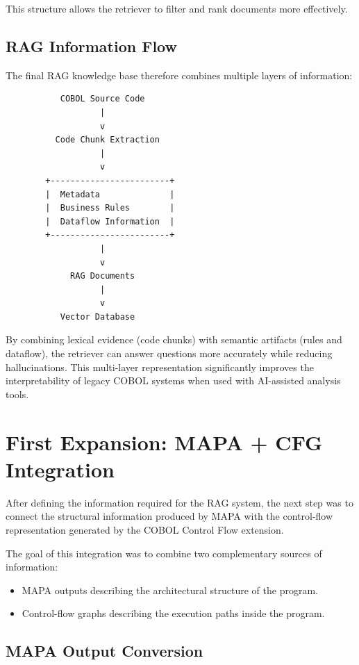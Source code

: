 \documentclass[11pt]{article}
\begin{document}
This structure allows the retriever to filter and rank documents more effectively.

\subsection*{RAG Information Flow}

The final RAG knowledge base therefore combines multiple layers of information:

\begin{center}
\begin{verbatim}
           COBOL Source Code
                   |
                   v
          Code Chunk Extraction
                   |
                   v
        +------------------------+
        |  Metadata              |
        |  Business Rules        |
        |  Dataflow Information  |
        +------------------------+
                   |
                   v
             RAG Documents
                   |
                   v
           Vector Database
\end{verbatim}
\end{center}

By combining lexical evidence (code chunks) with semantic artifacts (rules and dataflow), the retriever can answer questions more accurately while reducing hallucinations. This multi-layer representation significantly improves the interpretability of legacy COBOL systems when used with AI-assisted analysis tools.


\section{First Expansion: MAPA + CFG Integration}
\label{sec:integration}

After defining the information required for the RAG system, the next step was to connect the structural information produced by MAPA with the control-flow representation generated by the COBOL Control Flow extension.

The goal of this integration was to combine two complementary sources of information:

\begin{itemize}
\item MAPA outputs describing the architectural structure of the program.
\item Control-flow graphs describing the execution paths inside the program.
\end{itemize}

\subsection*{MAPA Output Conversion}
\end{document}

